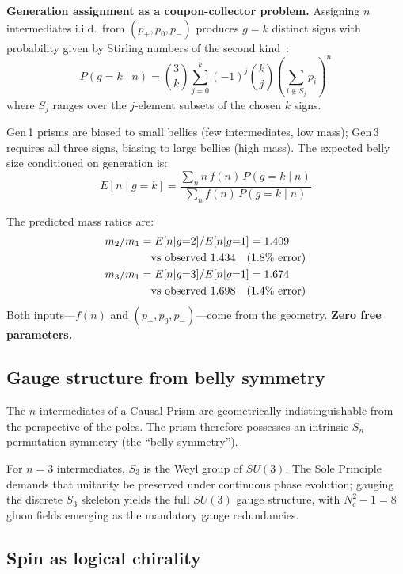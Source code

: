\documentclass[aps,prd,twocolumn,superscriptaddress,nofootinbib,amsmath,amssymb,longbibliography]{revtex4-2}
\begin{document}
\textbf{Generation assignment as a coupon-collector problem.}
Assigning $n$ intermediates i.i.d.\ from $(p_+, p_0, p_-)$ produces
$g = k$ distinct signs with probability given by Stirling numbers of
the second kind~\cite{flajolet2009}:
\begin{equation}\label{eq:coupon}
  P(g = k \mid n) = \binom{3}{k}\sum_{j=0}^{k}(-1)^j\binom{k}{j}
  \left(\sum_{i \notin S_j} p_i\right)^{\!n}
\end{equation}
where $S_j$ ranges over the $j$-element subsets of the chosen $k$ signs.

Gen\,1 prisms are biased to small bellies (few intermediates, low mass);
Gen\,3 requires all three signs, biasing to large bellies (high mass).
The expected belly size conditioned on generation is:
\begin{equation}
  E[n \mid g = k] = \frac{\sum_n n\,f(n)\,P(g{=}k \mid n)}
                         {\sum_n f(n)\,P(g{=}k \mid n)}
\end{equation}

The predicted mass ratios are:
\begin{align}
  m_2/m_1 &= E[n|g{=}2]/E[n|g{=}1] = 1.409 \notag\\
  &\quad\text{vs observed } 1.434 \quad (1.8\%\text{ error}) \notag\\
  m_3/m_1 &= E[n|g{=}3]/E[n|g{=}1] = 1.674 \notag\\
  &\quad\text{vs observed } 1.698 \quad (1.4\%\text{ error})
\end{align}
Both inputs---$f(n)$ and $(p_+, p_0, p_-)$---come from the geometry.
\textbf{Zero free parameters.}

\subsection{Gauge structure from belly symmetry}

The $n$ intermediates of a Causal Prism are geometrically
indistinguishable from the perspective of the poles.
The prism therefore possesses an intrinsic $S_n$ permutation symmetry
(the ``belly symmetry'').

For $n = 3$ intermediates, $S_3$ is the Weyl group of $SU(3)$.
The Sole Principle demands that unitarity be preserved under continuous
phase evolution; gauging the discrete $S_3$ skeleton yields the full
$SU(3)$ gauge structure, with $N_c^2 - 1 = 8$ gluon fields emerging as
the mandatory gauge redundancies.

\subsection{Spin as logical chirality}
\end{document}
